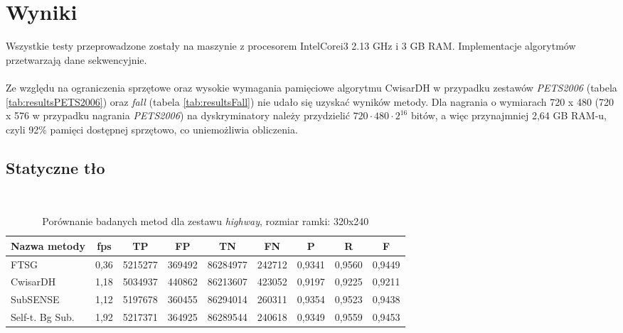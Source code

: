 \section{Wyniki}
Wszystkie testy przeprowadzone zostały na maszynie z procesorem Intel\textregistered Core\texttrademark i3 2.13 GHz i 3 GB RAM. Implementacje algorytmów przetwarzają dane sekwencyjnie.
\paragraph{}
Ze względu na ograniczenia sprzętowe oraz wysokie wymagania pamięciowe algorytmu CwisarDH w przypadku zestawów \textit{PETS2006} (tabela \ref{tab:resultsPETS2006}) oraz \textit{fall} (tabela \ref{tab:resultsFall}) nie udało się uzyskać wyników metody. Dla nagrania o wymiarach 720 x 480 (720 x 576 w przypadku nagrania \textit{PETS2006}) na dyskryminatory należy przydzielić $720 \cdot 480 \cdot 2^{16}$ bitów, a więc przynajmniej 2,64 GB RAM-u, czyli 92\% pamięci dostępnej sprzętowo, co uniemożliwia obliczenia.

\subsection{Statyczne tło}
~
\FloatBarrier
\begin{table}[!h]
\small
\caption{Porównanie badanych metod dla zestawu \textit{highway}, rozmiar ramki: 320x240}
\label{tab:resultsHighway}
\centering
\begin{tabular*}{\textwidth}{@{\extracolsep{\fill}} |l*{8}{|c}|}
  \hline 
  \textbf{Nazwa metody} & \textbf{fps} & \textbf{TP} & \textbf{FP} & \textbf{TN} & \textbf{FN} & \textbf{P} & \textbf{R} & \textbf{F}\\
  \hline
  FTSG & 0,36 & 5215277 & 369492 & 86284977 & 242712 & 0,9341 & 0,9560 & 0,9449\\ 
\hline
CwisarDH & 1,18 & 5034937 & 440862 & 86213607 & 423052 & 0,9197 & 0,9225 & 0,9211\\ 
\hline
SubSENSE & 1,12 & 5197678 & 360455 & 86294014 & 260311 & 0,9354 & 0,9523 & 0,9438\\ 
\hline
Self-t. Bg Sub. & 1,92 & 5217371 & 364925 & 86289544 & 240618 & 0,9349 & 0,9559 & 0,9453\\ 
\hline
\end{tabular*}
\end{table}

